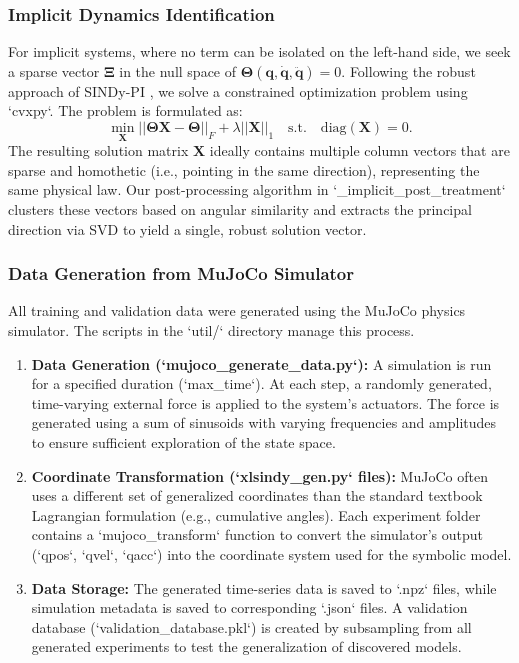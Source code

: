 \documentclass[12pt]{article}
\begin{document}
\subsubsection*{Implicit Dynamics Identification}
For implicit systems, where no term can be isolated on the left-hand side, we seek a sparse vector $\mathbf{\Xi}$ in the null space of $\mathbf{\Theta}(\mathbf{q}, \dot{\mathbf{q}}, \ddot{\mathbf{q}})=0$. Following the robust approach of SINDy-PI \cite{Kaheman2020_SINDyPI}, we solve a constrained optimization problem using `cvxpy`. The problem is formulated as:
\begin{equation}
	\min_{\mathbf{X}} ||\mathbf{\Theta X} - \mathbf{\Theta}||_F + \lambda||\mathbf{X}||_1 \quad \text{s.t.} \quad \text{diag}(\mathbf{X}) = 0.
\end{equation}
The resulting solution matrix $\mathbf{X}$ ideally contains multiple column vectors that are sparse and homothetic (i.e., pointing in the same direction), representing the same physical law. Our post-processing algorithm in `_implicit_post_treatment` clusters these vectors based on angular similarity and extracts the principal direction via SVD to yield a single, robust solution vector.

\subsubsection*{Data Generation from MuJoCo Simulator}
All training and validation data were generated using the MuJoCo physics simulator. The scripts in the `util/` directory manage this process.
\begin{enumerate}
    \item \textbf{Data Generation (`mujoco_generate_data.py`):} A simulation is run for a specified duration (`max_time`). At each step, a randomly generated, time-varying external force is applied to the system's actuators. The force is generated using a sum of sinusoids with varying frequencies and amplitudes to ensure sufficient exploration of the state space.
    \item \textbf{Coordinate Transformation (`xlsindy_gen.py` files):} MuJoCo often uses a different set of generalized coordinates than the standard textbook Lagrangian formulation (e.g., cumulative angles). Each experiment folder contains a `mujoco_transform` function to convert the simulator's output (`qpos`, `qvel`, `qacc`) into the coordinate system used for the symbolic model.
    \item \textbf{Data Storage:} The generated time-series data is saved to `.npz` files, while simulation metadata is saved to corresponding `.json` files. A validation database (`validation_database.pkl`) is created by subsampling from all generated experiments to test the generalization of discovered models.
\end{enumerate}
\end{document}

